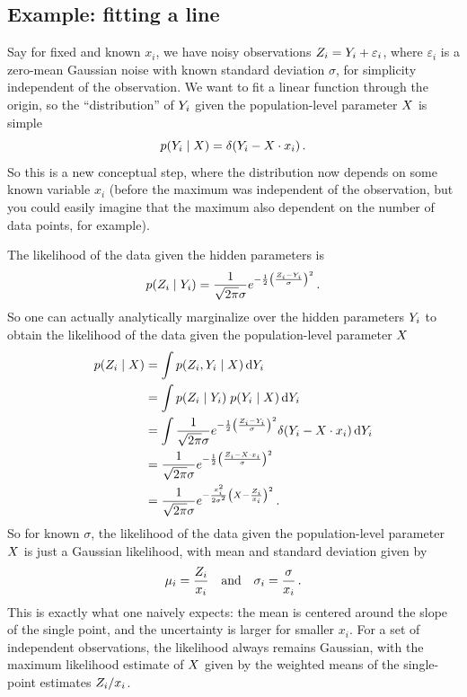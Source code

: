 \documentclass[12pt,a4paper]{article}
\begin{document}
\subsection{Example: fitting a line}

Say for fixed and known $x_i$, we have noisy observations $Z_i = Y_{i} + \varepsilon_i$, where $\varepsilon_i$ is a zero-mean Gaussian noise with known standard deviation $\sigma$, for simplicity independent of the observation.
We want to fit a linear function through the origin, so the ``distribution'' of $Y_{i}$ given the population-level parameter $X$ is simple
\[
    p(Y_{i} \mid X) = \delta(Y_{i} - X \cdot x_i)
    \,.
\]
So this is a new conceptual step, where the distribution now depends on some known variable $x_i$ (before the maximum was independent of the observation, but you could easily imagine that the maximum also dependent on the number of data points, for example).

The likelihood of the data given the hidden parameters is
\[
    p(Z_i \mid Y_{i}) = \frac{1}{\sqrt{2\pi}\sigma} e^{-\frac{1}{2}\left(\frac{Z_i - Y_{i}}{\sigma}\right)^2}   
    \,.
\]
So one can actually analytically marginalize over the hidden parameters $Y_{i}$ to obtain the likelihood of the data given the population-level parameter $X$
\begin{align}
    p(Z_i \mid X) &=
    \int p(Z_i , Y_{i} \mid X) \, \mathrm{d} Y_{i} \nonumber \\
    &= \int p(Z_i \mid Y_{i}) \; p(Y_{i} \mid X) \, \mathrm{d} Y_{i} \nonumber \\
    &= \int \frac{1}{\sqrt{2\pi}\sigma} e^{-\frac{1}{2}\left(\frac{Z_i - Y_{i}}{\sigma}\right)^2} \delta(Y_{i} - X \cdot x_i) \, \mathrm{d} Y_{i} \nonumber \\
    &= \frac{1}{\sqrt{2\pi}\sigma} e^{-\frac{1}{2}\left(\frac{Z_i - X \cdot x_i}{\sigma}\right)^2} \nonumber \\
    &= \frac{1}{\sqrt{2\pi}\sigma} e^{-\frac{x_i^2}{2\sigma^2 }\left(X - \frac{Z_i}{x_i}\right)^2}
     \,.
\end{align}
So for known $\sigma$, the likelihood of the data given the population-level parameter $X$ is just a Gaussian likelihood, with mean and standard deviation given by
\[
    \mu_i = \frac{Z_i}{x_i} \quad\text{and}\quad \sigma_i = \frac{\sigma}{x_i}
    \,.
\]
This is exactly what one naively expects: the mean is centered around the slope of the single point, and the uncertainty is larger for smaller $x_i$.
For a set of independent observations, the likelihood always remains Gaussian, with the maximum likelihood estimate of $X$ given by the weighted means of the single-point estimates $Z_i / x_i$.
\end{document}
